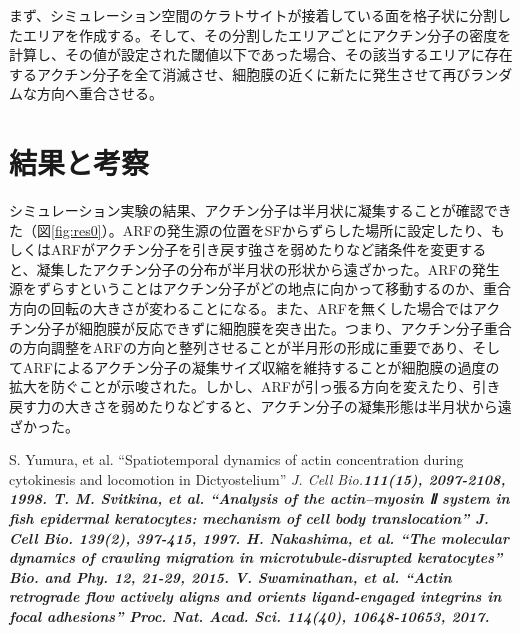 \documentclass[10pt,twocolumn,a4j]{jarticle}
\begin{document}
まず、シミュレーション空間のケラトサイトが接着している面を格子状に分割したエリアを作成する。そして、その分割したエリアごとにアクチン分子の密度を計算し、その値が設定された閾値以下であった場合、その該当するエリアに存在するアクチン分子を全て消滅させ、細胞膜の近くに新たに発生させて再びランダムな方向へ重合させる。
\section{結果と考察}
シミュレーション実験の結果、アクチン分子は半月状に凝集することが確認できた（図\ref{fig:res0}）。ARFの発生源の位置をSFからずらした場所に設定したり、もしくはARFがアクチン分子を引き戻す強さを弱めたりなど諸条件を変更すると、凝集したアクチン分子の分布が半月状の形状から遠ざかった。ARFの発生源をずらすということはアクチン分子がどの地点に向かって移動するのか、重合方向の回転の大きさが変わることになる。また、ARFを無くした場合ではアクチン分子が細胞膜が反応できずに細胞膜を突き出た。つまり、アクチン分子重合の方向調整をARFの方向と整列させることが半月形の形成に重要であり、そしてARFによるアクチン分子の凝集サイズ収縮を維持することが細胞膜の過度の拡大を防ぐことが示唆された。しかし、ARFが引っ張る方向を変えたり、引き戻す力の大きさを弱めたりなどすると、アクチン分子の凝集形態は半月状から遠ざかった。



\begin{thebibliography}{9}
  S. Yumura, et al.
    ``Spatiotemporal dynamics of actin concentration during cytokinesis and locomotion in Dictyostelium''  \sl{J. Cell Bio.}\bf{111}\rm{(15)}, 2097-2108, 1998.
      T. M. Svitkina, et al.
    ``Analysis of the actin--myosin Ⅱ system in fish epidermal keratocytes: mechanism of cell body translocation''  \sl{J. Cell Bio.} \bf{139}\rm{(2)}, 397-415, 1997.
   H. Nakashima, et al.
    ``The molecular dynamics of crawling migration in microtubule-disrupted keratocytes''  \sl{Bio. and Phy.} \bf{12}\rm{}, 21-29, 2015.
        V. Swaminathan, et al.
    ``Actin retrograde flow actively aligns and orients ligand-engaged integrins in focal adhesions''  \sl{Proc. Nat. Acad. Sci.} \bf{114}\rm{(40)}, 10648-10653, 2017.
\end{thebibliography}
\end{document}
